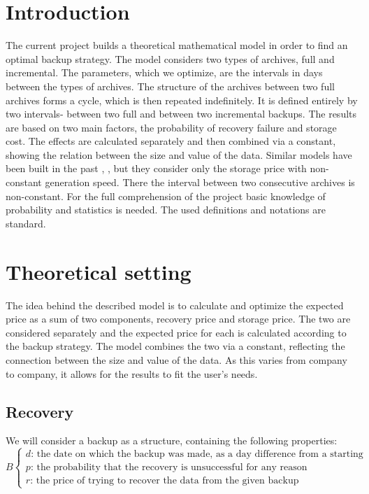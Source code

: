 \documentclass[11pt, a4paper]{article}
\theoremstyle{definition}
\begin{document}
\section{Introduction}
	The current project builds a theoretical mathematical model in order to find an optimal backup strategy. The model considers two types of archives, full and incremental. The parameters, which we optimize, are the intervals in days between the types of archives. The structure of the archives between two full archives forms a cycle, which is then repeated indefinitely. It is defined entirely by two intervals- between two full and between two incremental backups. The results are based on two main factors, the probability of recovery failure and storage cost. The effects are calculated separately and then combined via a constant, showing the relation between the size and value of the data. Similar models have been built in the past \cite{qian2010optimal}, \cite{nakamura2003optimal}, but they consider only the storage price with non-constant generation speed. There the interval between two consecutive archives is non-constant. For the full comprehension of the project basic knowledge of probability and statistics is needed. The used definitions and notations are standard.
\newpage
\section{Theoretical setting}
		The idea behind the described model is to calculate and optimize the expected price as a sum of two components, recovery price and storage price. The two are considered separately and the expected price for each is calculated according to the backup strategy. The model combines the two via a constant, reflecting the connection between the size and value of the data. As this varies from company to company, it allows for the results to fit the user's needs.
	\subsection{Recovery}
		We will consider a backup as a structure, containing the following properties:
		$$
		B
		\begin{cases}
			d \text{: the date on which the backup was made, as a day difference from a starting point}\\
			p \text{: the probability that the recovery is unsuccessful for any reason}\\
			r \text{: the price of trying to recover the data from the given backup}
		\end{cases}
		$$
		
\end{document}
